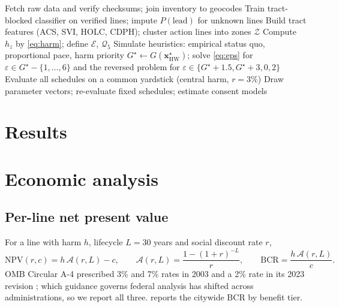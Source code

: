 \documentclass[11pt]{article}
\newcommand{\Zs}{\mathcal{Z}}
\newcommand{\EJ}{\mathcal{E}}
\newcommand{\Qf}{\mathcal{Q}_5}
\begin{document}
\begin{algorithm}[t]
\caption{End-to-end pipeline}\label{alg:pipeline}
Fetch raw data and verify checksums; join inventory to geocodes\;
Train tract-blocked classifier on verified lines; impute $P(\text{lead})$ for unknown lines\;
Build tract features (ACS, SVI, HOLC, CDPH); cluster action lines into zones $\Zs$\;
Compute $h_z$ by \cref{eq:harm}; define $\EJ$, $\Qf$\;
Simulate heuristics: empirical status quo, proportional pace, harm priority\;
$G^\star\leftarrow G(\symbf x^\star_{\mathrm{HW}})$; solve \cref{eq:eps} for $\varepsilon\in G^\star-\{1,\dots,6\}$ and the reversed problem for $\varepsilon\in\{G^\star+1.5,G^\star+3,0,2\}$\;
Evaluate all schedules on a common yardstick (central harm, $r=3\%$)\;
Draw \PsaN{} parameter vectors; re-evaluate fixed schedules; estimate consent models\;
\end{algorithm}

\section{Results}\label{sec:results}


\section{Economic analysis}\label{sec:econ}
\subsection{Per-line net present value}
For a line with harm $h$, lifecycle $L=30$ years and social discount rate $r$,
\begin{equation}
\mathrm{NPV}(r,c)=h\,\mathcal A(r,L)-c,\qquad \mathcal A(r,L)=\frac{1-(1+r)^{-L}}{r},\qquad
\mathrm{BCR}=\frac{h\,\mathcal A(r,L)}{c}.\label{eq:npv}
\end{equation}
OMB Circular A-4 prescribed 3\% and 7\% rates in 2003 and a 2\% rate in its 2023 revision
\citep{omb2003a4,omb2023a4}; which guidance governs federal analysis has shifted across
administrations, so we report all three.  reports the citywide BCR by benefit tier.
\end{document}
